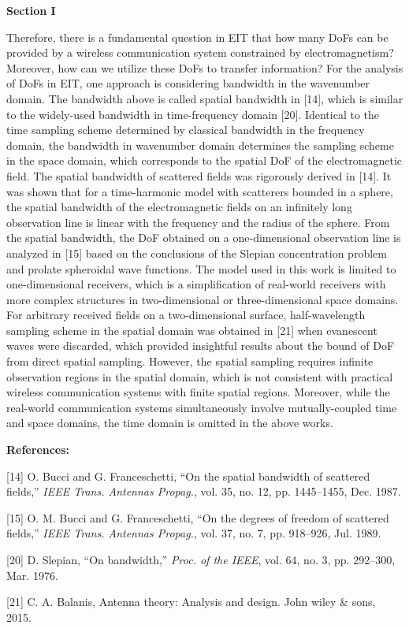 \documentclass[a4paper,12pt]{article}
\begin{document}
\begin{framed}
	{\bf Section I}

   \quad Therefore, there is a fundamental question in EIT that how many DoFs can be provided by a wireless communication system constrained by electromagnetism? Moreover, how can we utilize these DoFs to transfer information? For the analysis of DoFs in EIT, one approach is considering bandwidth in the wavenumber domain.  The bandwidth above is called spatial bandwidth in [14], which is similar to the widely-used bandwidth in time-frequency domain [20]. Identical to the time sampling scheme determined by classical bandwidth in the frequency domain, the bandwidth in wavenumber domain determines the sampling scheme in the space domain, which corresponds to the spatial DoF of the electromagnetic field. The spatial bandwidth of scattered fields was rigorously derived in [14]. It was shown that for a time-harmonic model with scatterers bounded in a sphere, the spatial bandwidth of the electromagnetic fields on an infinitely long observation line is linear with the frequency and the radius of the sphere. {\color{red} From the spatial bandwidth, the DoF obtained on a one-dimensional observation line is analyzed in [15] based on the conclusions of the Slepian concentration problem and prolate spheroidal wave functions. The model used in this work is limited to one-dimensional receivers, which is a simplification of real-world receivers with more complex structures in two-dimensional or three-dimensional space domains.} For arbitrary received fields on a two-dimensional surface, half-wavelength sampling scheme in the spatial domain was obtained in [21] when evanescent waves were discarded, which provided insightful results about the bound of DoF from direct spatial sampling. However, the spatial sampling requires infinite observation regions in the spatial domain, which is not consistent with practical wireless communication systems with finite spatial regions. {\color{red} Moreover, while the real-world communication systems simultaneously involve mutually-coupled time and space domains, the time domain is omitted in the above works.}

\end{framed}

{\color{blue}
	{\bf References:}
	
	[14] O. Bucci and G. Franceschetti, “On the spatial bandwidth of scattered fields,” {\it IEEE Trans. Antennas Propag.}, vol. 35, no. 12, pp.
	1445–1455, Dec. 1987.
	
	[15] O. M. Bucci and G. Franceschetti, “On the degrees of freedom of scattered fields,” {\it IEEE Trans. Antennas Propag.}, vol. 37, no. 7,
	pp. 918–926, Jul. 1989.
	
	[20] D. Slepian, “On bandwidth,” {\it Proc. of the IEEE}, vol. 64, no. 3, pp. 292–300, Mar. 1976.
	
	[21] C. A. Balanis, Antenna theory: Analysis and design. John wiley \& sons, 2015.
	
}
\end{document}
